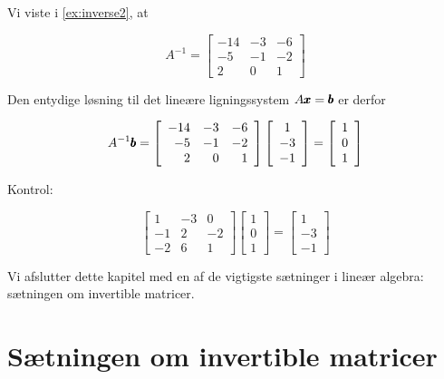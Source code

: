 \begin{solution} Vi viste i \autoref{ex:inverse2}, at

    \[
    A^{-1}=\left[\begin{array}{rrr}
    -14 & -3 & -6 \\
    -5 & -1 & -2 \\
    2 & 0 & 1
    \end{array}\right]
    \]

Den entydige løsning til det lineære ligningssystem $A \pmb{x} = \pmb{b}$ er derfor

    \[
    A^{-1} \pmb{b}=\left[\begin{array}{rrr}
    -14 & -3 & -6 \\
    -5 & -1 & -2 \\
    2 & 0 & 1
    \end{array}\right]\left[\begin{array}{c}
    1 \\
    -3 \\
    -1
    \end{array}\right]=\left[\begin{array}{l}
    1 \\
    0 \\
    1
    \end{array}\right]
    \]

Kontrol:

    \[
    \left[\begin{array}{rrr}
    1 & -3 & 0 \\
    -1 & 2 & -2 \\
    -2 & 6 & 1
    \end{array}\right]\left[\begin{array}{l}
    1 \\
    0 \\
    1
    \end{array}\right]=\left[\begin{array}{c}
    1 \\
    -3 \\
    -1
    \end{array}\right]
    \]
\end{solution}

Vi afslutter dette kapitel med en af de vigtigste sætninger i lineær algebra: sætningen om invertible matricer.

\section{Sætningen om invertible matricer}

